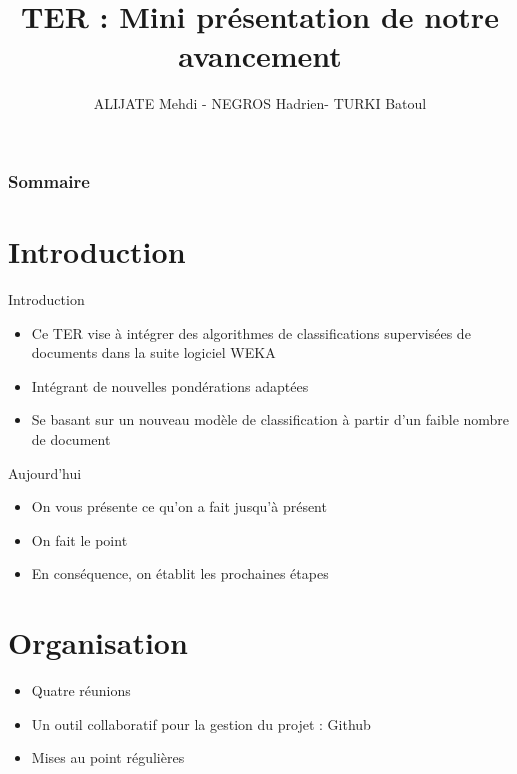 \documentclass[12pt]{beamer}
\author{ALIJATE Mehdi -  NEGROS Hadrien- TURKI Batoul}
\title{TER :  Mini présentation de notre avancement}
\begin{document}
\begin{frame}
\titlepage 


\end{frame}


\begin{frame}
\tableofcontents
\frametitle{Sommaire}


\end{frame}

\section{Introduction}

\begin{frame}
\begin{block}{Introduction}
\begin{itemize}
\item Ce TER vise à intégrer des algorithmes de classifications supervisées de documents dans la suite logiciel WEKA 
\item Intégrant de nouvelles pondérations adaptées
\item Se basant sur un nouveau modèle de classification à partir d’un faible nombre de document
\end{itemize} 
\end{block}

\begin{block}{Aujourd'hui}
\begin{itemize}
\item On vous présente ce qu'on a fait jusqu'à présent
\item On fait le point
\item En conséquence, on établit les prochaines étapes
\end{itemize}
\end{block}

\end{frame}

\section{Organisation}
\begin{frame}
\begin{itemize}
	\item Quatre réunions
	\item Un outil collaboratif pour la gestion du projet : Github
	\item Mises au point régulières
\end{itemize}
\end{frame}
\end{document}
